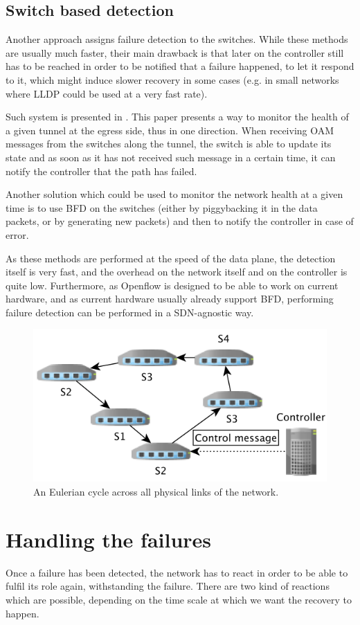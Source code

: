 \documentclass[]{IEEEtran}
\begin{document}
\subsection{Switch based detection}
Another approach assigns failure detection to the switches. While these methods are usually much faster, their main drawback is that later on the controller still has to be reached in order to be notified that a failure happened, to let it respond to it, which might induce slower recovery in some cases (e.g. in small networks where LLDP could be used at a very fast rate).

Such system is presented in \cite{6364688}. This paper presents a way to monitor the health of a given tunnel at the egress side, thus in one direction. When receiving OAM messages from the switches along the tunnel, the switch is able to update its state and as soon as it has not received such message in a certain time, it can notify the controller that the path has failed.

Another solution which could be used to monitor the network health at a given time is to use BFD\cite{rfc5880} on the switches (either by piggybacking it in the data packets, or by generating new packets) and then to notify the controller in case of error.

As these methods are performed at the speed of the data plane, the detection itself is very fast, and the overhead on the network itself and on the controller is quite low. Furthermore, as Openflow is designed to be able to work on current hardware, and as current hardware usually already support BFD, performing failure detection can be performed in a SDN-agnostic way.

\begin{figure}
	\includegraphics[width=.5\textwidth]{images/euler.png}
	\caption{An Eulerian cycle across all physical links of the network.}
	\label{fig:cycle}
\end{figure}

\section{Handling the failures}
Once a failure has been detected, the network has to react in order to be able to fulfil its role again, withstanding the failure. There are two kind of reactions which are possible, depending on the time scale at which we want the recovery to happen.
\end{document}
